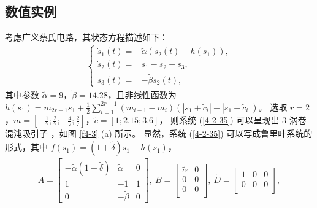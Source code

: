 \subsection{数值实例}\label{ne}
考虑广义蔡氏电路，其状态方程描述如下： 
\begin{align}\label{4-2-35}\left\{
\begin{aligned}
\dot{s}_1(t)=&\tilde{\alpha}(s_2(t)-h(s_1)),\\
\dot{s}_2(t)=&s_1-s_2+s_3,\\
\dot{s}_3(t)=&-\tilde{\beta}s_2(t),
\end{aligned}
\right.
\end{align}
其中参数 $\tilde{\alpha}=9$，$ \tilde{\beta}=14.28$，且非线性函数为 $h(s_1)=m_{2r-1}s_1+\frac{1}{2}\sum\limits_{i=1}^{2r-1}(m_{i-1}-m_i)(|s_1+\tilde{c}_i|-|s_1-\tilde{c}_i|)$。 选取 $r=2$，$ m=[-\frac{1}{7};\frac{2}{7};-\frac{4}{7};\frac{2}{7}]$，$\tilde{c} = [1; 2.15; 3.6]$， 则系统 (\ref{4-2-35})  可以呈现出 3-涡卷混沌吸引子 \cite{yalcin2000experimental425}，如图 \ref{f4-3} (a) 所示。 显然，系统 (\ref{4-2-35}) 可以写成鲁里叶系统的形式，其中 $f(s_1)=(1+\tilde{\delta})s_1-h(s_1)$， 
\begin{align*} A=
\left[ \begin{array}{ccc} -\tilde{\alpha}(1+\tilde{\delta})&\tilde{\alpha}&0\\
1&-1&1\\
0&-\tilde{\beta}&0
\end{array}\right],\ 
 B=
\left[ \begin{array}{cc} \tilde{\alpha}&0\\
0&0\\
0&0\\
\end{array}\right],\ 
 \tilde{D}=
\left[ \begin{array}{ccc} 1&0&0\\
0&0&0\\
\end{array}\right],
\end{align*}
